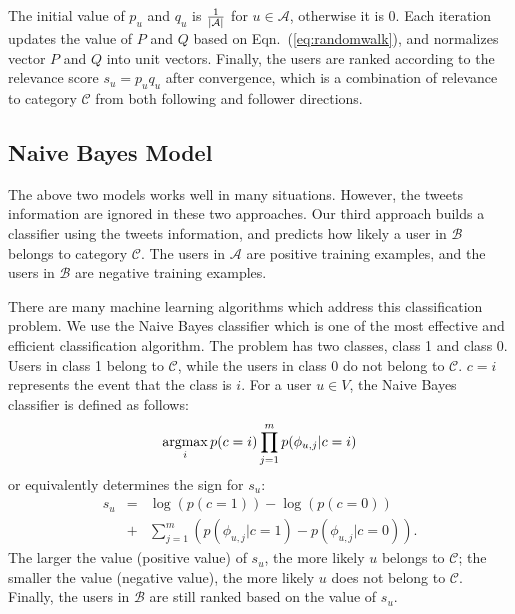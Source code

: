 \documentclass{article}
\begin{document}
The initial value of $p_u$ and $q_u$ is ${1 \over |\mathcal{A}|}$ for $u \in \mathcal{A}$, otherwise it is 0. Each iteration updates the value of $P$ and $Q$ based on Eqn.~(\ref{eq:randomwalk}), and normalizes vector $P$ and $Q$ into unit vectors. Finally, the users are ranked according to the relevance score $s_u = p_u q_u$ after convergence, which is a combination of relevance to category $\mathcal{C}$ from both following and follower directions.

\subsection{Naive Bayes Model}

The above two models works well in many situations. However, the tweets information are ignored in these two approaches. Our third approach builds a classifier using the tweets information, and predicts how likely a user in $\mathcal{B}$ belongs to category $\mathcal{C}$. The users in $\mathcal{A}$ are positive training examples, and the users in $\mathcal{B}$ are negative training examples.


There are many machine learning algorithms which address this classification problem. We use the Naive Bayes classifier \cite{bayes} which is one of the most effective and efficient classification algorithm. The problem has two classes, class 1 and class 0. Users in class 1 belong to $\mathcal{C}$, while the users in class 0 do not belong to $\mathcal{C}$. $c = i$ represents the event that the class is $i$. For a user $u \in V$, the Naive Bayes classifier is defined as follows:
$$\argmax_i p(c = i) \prod_{j=1}^m p(\phi_{u,j}|c = i)$$
or equivalently determines the sign for $s_u$:
\begin{eqnarray}\label{eq:bayes}
s_u & = & \log(p(c = 1)) - \log(p(c = 0)) \nonumber \\
    & + & \sum_{j=1}^m (p(\phi_{u,j}|c = 1) - p(\phi_{u,j}|c = 0)).
\end{eqnarray}
The larger the value (positive value) of $s_u$, the more likely $u$ belongs to $\mathcal{C}$; the smaller the value (negative value), the more likely $u$ does not belong to $\mathcal{C}$. Finally, the users in $\mathcal{B}$ are still ranked based on the value of $s_u$.
\end{document}
